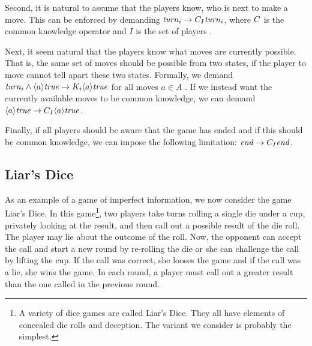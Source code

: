 Second, it is natural to assume that the players know, who is next to make a move. This can be enforced by demanding $ \mathit{turn}_{i} \rightarrow C_{I} \mathit{turn}_{i} $, where $ C $ is the common knowledge operator and $ I $ is the set of players \cite{benthem2001a}.

Next, it seem natural that the players know what moves are currently possible. That is, the same set of moves should be possible from two states, if the player to move cannot tell apart these two states. Formally, we demand $ \mathit{turn}_{i} \wedge \langle a \rangle \mathit{true} \rightarrow K_{i} \langle a \rangle \mathit{true} $ for all moves $ a \in A $ \cite{benthem2001a}. If we instead want the currently available moves to be common knowledge, we can demand $ \langle a \rangle \mathit{true} \rightarrow C_{I} \langle a \rangle \mathit{true} $.

Finally, if all players should be aware that the game has ended and if this should be common knowledge, we can impose the following limitation: $ \mathit{end} \rightarrow C_{I} \mathit{end} $.




\subsection{Liar's Dice}

As an example of a game of imperfect information, we now consider the game Liar's Dice. In this game\footnote{A variety of dice games are called Liar's Dice. They all have elements of concealed die rolls and deception. The variant we consider is probably the simplest.}, two players take turns rolling a single die under a cup, privately looking at the result, and then call out a possible result of the die roll. The player may lie about the outcome of the roll. Now, the opponent can accept the call and start a new round by re-rolling the die or she can challenge the call by lifting the cup. If the call was correct, she looses the game and if the call was a lie, she wins the game. In each round, a player must call out a greater result than the one called in the previous round.


